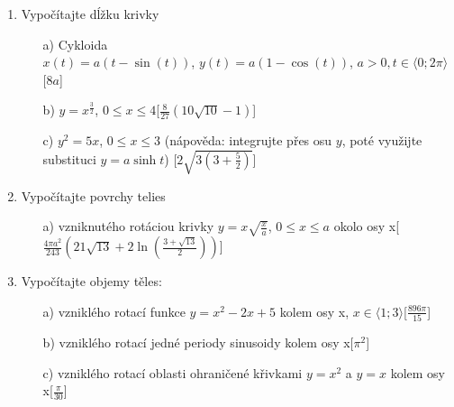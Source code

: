 \begin{enumerate}
\item Vypočítajte dĺžku krivky

\begin{enumerate}
\item[a)]Cykloida\\
{$x(t) = a (t - \sin (t))$, $y(t) = a (1 - \cos(t))$}, $a>0, t \in \langle 0;2\pi \rangle$
\hspace{\fill}[$8a$]
\item[b)]{$y=x^{\frac{3}{2}}$, $0 \leq x \leq 4$}\hspace{\fill}[$\frac{8}{27}(10\sqrt{10}-1)$]
\item[c)]{$y^2=5x$, $0 \leq x \leq 3$} (nápověda: integrujte přes osu $y$, poté využijte substituci $y = a\sinh{t}$)
\hspace{\fill}[$2\sqrt{3(3+\frac{5}{2})}$]
\end{enumerate}

\item Vypočítajte povrchy telies
\begin{enumerate}
\item[a)]{vzniknutého rotáciou krivky $y=x\sqrt{\frac{x}{a}}$, $0\leq x \leq a$ okolo osy x}\hspace{\fill}[$\frac{4\pi a^2}{243}(21 \sqrt{13}+2\ln(\frac{3+\sqrt{13}}{2}))$]

\end{enumerate}


\item Vypočítajte objemy těles:
\begin{enumerate}
\item[a)]vzniklého rotací funkce {$y=x^2-2x+5$ kolem osy x, $x \in \langle1;3\rangle$}\hspace{\fill}[$\frac{896\pi}{15}$]
\item[b)]vzniklého rotací jedné periody sinusoidy kolem osy x\hspace{\fill}[$\pi^2$]
\item[c)]vzniklého rotací oblasti ohraničené křivkami {$y=x^2$ a $y=x$ kolem osy x}\hspace{\fill}[$\frac{\pi}{30}$]
\end{enumerate}
\end{enumerate}